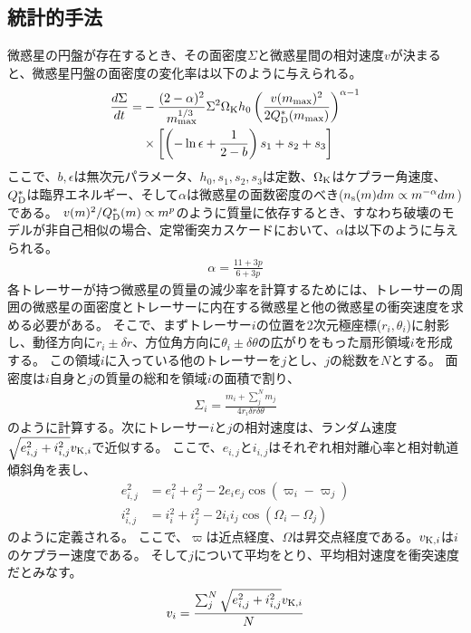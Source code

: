 \documentclass[a4paper,10pt,oneside,twocolumn,notitlepage,final]{jarticle}
\begin{document}
\subsection{統計的手法}
微惑星の円盤が存在するとき、その面密度$\Sigma$と微惑星間の相対速度$v$が決まると、微惑星円盤の面密度の変化率は以下のように与えられる\citep{Kobayashi_Tanaka_2010}。
\begin{align}
 \frac{d \Sigma}{d t} =& - \frac{(2 - \alpha)^2}{m_{\rm max}^{1/3}} \Sigma^2 \Omega_{\rm K} h_0 \left( \frac{v(m_{\rm max})^2}{2 Q_{\rm D}^{\ast}(m_{\rm max})} \right)^{\alpha - 1} \nonumber \\
 &\times \left[ \left( - \ln \epsilon + \frac{1}{2 - b} \right) s_1 + s_2 + s_3 \right] \label{eq:tau}
\end{align}
ここで、$b,\epsilon$は無次元パラメータ、$h_0,s_1,s_2,s_3$は定数、$\Omega_{\rm K}$はケプラー角速度、$Q_{\rm D}^{\ast}$は臨界エネルギー、そして$\alpha$は微惑星の面数密度のべき($n_{\rm s} (m) dm \propto m^{- \alpha} dm$)である。
$v(m)^2/Q_{\rm D}^{\ast}(m) \propto m^p$のように質量に依存するとき、すなわち破壊のモデルが非自己相似の場合、定常衝突カスケードにおいて、$\alpha$は以下のように与えられる\citep{Kobayashi_Tanaka_2010}。
\begin{align}
 \alpha = \frac{11 + 3p}{6 + 3p}
\end{align}
各トレーサーが持つ微惑星の質量の減少率を計算するためには、トレーサーの周囲の微惑星の面密度とトレーサーに内在する微惑星と他の微惑星の衝突速度を求める必要がある。
そこで、まずトレーサー$i$の位置を2次元極座標($r_i,\theta_i$)に射影し、動径方向に$r_i \pm \delta r$、方位角方向に$\theta_i \pm \delta \theta$の広がりをもった扇形領域$i$を形成する\citep{Morishima_2015}。
この領域$i$に入っている他のトレーサーを$j$とし、$j$の総数を$N$とする。
面密度は$i$自身と$j$の質量の総和を領域$i$の面積で割り、
\begin{align}
 \Sigma_i = \frac{m_i + \sum_{j}^{N} m_j}{4 r_i \delta r \delta \theta}
\end{align}
のように計算する。次にトレーサー$i$と$j$の相対速度は、ランダム速度$\sqrt{e_{i,j}^2 + i_{i,j}^2} v_{{\rm K},i}$で近似する。
ここで、$e_{i,j}$と$i_{i,j}$はそれぞれ相対離心率と相対軌道傾斜角を表し、
\begin{align}
 e_{i,j}^2 &= e_i^2 + e_j^2 - 2 e_i e_j \cos(\varpi_i - \varpi_j)\\
 i_{i,j}^2 &= i_i^2 + i_j^2 - 2 i_i i_j \cos(\Omega_i - \Omega_j)
\end{align}
のように定義される。
ここで、$\varpi$は近点経度、$\Omega$は昇交点経度である。$v_{{\rm K},i}$は$i$のケプラー速度である。
そして$j$について平均をとり、平均相対速度を衝突速度だとみなす。
\begin{align}
 v_i = \frac{\sum_{j}^{N} \sqrt{e_{i,j}^2+i_{i,j}^2} v_{{\rm K},i}}{N}
\end{align}
\end{document}
